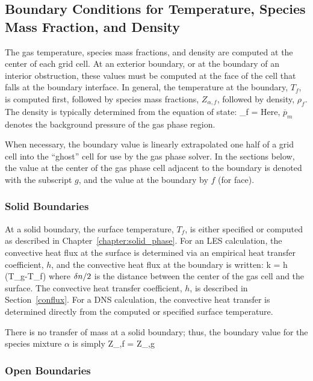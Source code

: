 \subsection{Boundary Conditions for Temperature, Species Mass Fraction, and Density}

The gas temperature, species mass fractions, and density are computed at the center of each grid cell. At an exterior boundary, or at
the boundary of an interior obstruction, these values must be computed at the face of the cell that falls at the boundary interface. In general, the temperature at the boundary, $T_f$, is
computed first, followed by species mass fractions, $Z_{\alpha,f}$, followed by density, $\rho_f$. The density is typically determined from the equation of state:
\be  \rho_f =   \ee 
Here, $\overline{p}_m$ denotes the background pressure of the gas phase region.

When necessary, the boundary value is linearly extrapolated one half
of a grid cell into the ``ghost'' cell for use by the gas phase solver. In the sections below, the value at the center of the gas phase cell
adjacent to the boundary is denoted with the subscript $g$, and the value at the boundary by $f$ (for face).

\subsubsection{Solid Boundaries}

At a solid boundary, the surface temperature, $T_f$, is either specified or computed as described in Chapter~\ref{chapter:solid_phase}.
For an LES calculation, the convective heat flux at the surface is determined via an empirical heat transfer coefficient, $h$, and the convective heat flux at the boundary is written:
\be k  = h \; (T_g-T_f)  \label{ebal} \ee
where $\delta n/2$ is the distance between the center of the gas cell
and the surface. The convective heat transfer coefficient, $h$, is described in Section~\ref{conflux}. For a DNS calculation, the convective 
heat transfer is determined directly from the computed or specified surface temperature.

There is no transfer of mass at a solid boundary; thus, the boundary value for the species mixture $\alpha$ is simply
\be Z_{\alpha,f} = Z_{\alpha,g} \ee

\subsubsection{Open Boundaries}

